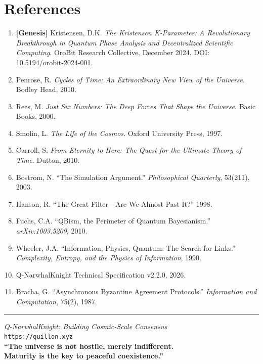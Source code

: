 \documentclass[12pt,a4paper]{article}
\begin{document}
\section{References}

\begin{enumerate}
    \item \textbf{[Genesis]} Kristensen, D.K. \textit{The Kristensen K-Parameter: A Revolutionary Breakthrough
          in Quantum Phase Analysis and Decentralized Scientific Computing}. OroBit Research Collective,
          December 2024. DOI: 10.5194/orobit-2024-001.
    \item Penrose, R. \textit{Cycles of Time: An Extraordinary New View of the Universe}. Bodley Head, 2010.
    \item Rees, M. \textit{Just Six Numbers: The Deep Forces That Shape the Universe}. Basic Books, 2000.
    \item Smolin, L. \textit{The Life of the Cosmos}. Oxford University Press, 1997.
    \item Carroll, S. \textit{From Eternity to Here: The Quest for the Ultimate Theory of Time}. Dutton, 2010.
    \item Bostrom, N. ``The Simulation Argument.'' \textit{Philosophical Quarterly}, 53(211), 2003.
    \item Hanson, R. ``The Great Filter---Are We Almost Past It?'' 1998.
    \item Fuchs, C.A. ``QBism, the Perimeter of Quantum Bayesianism.'' \textit{arXiv:1003.5209}, 2010.
    \item Wheeler, J.A. ``Information, Physics, Quantum: The Search for Links.'' \textit{Complexity,
          Entropy, and the Physics of Information}, 1990.
    \item Q-NarwhalKnight Technical Specification v2.2.0, 2026.
    \item Bracha, G. ``Asynchronous Byzantine Agreement Protocols.'' \textit{Information and Computation}, 75(2), 1987.
\end{enumerate}

\vspace{1cm}
\hrule
\vspace{0.5cm}
\begin{center}
\textit{Q-NarwhalKnight: Building Cosmic-Scale Consensus}\\
\texttt{https://quillon.xyz}\\[0.3cm]
\textbf{``The universe is not hostile, merely indifferent.\\
Maturity is the key to peaceful coexistence.''}
\end{center}
\end{document}
